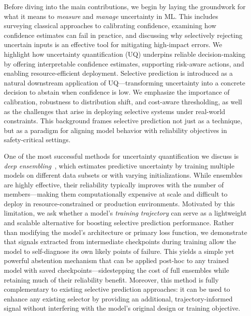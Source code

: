 Before diving into the main contributions, we begin by laying the groundwork for what it means to \emph{measure} and \emph{manage} uncertainty in ML. This includes surveying classical approaches to calibrating confidence, examining how confidence estimates can fail in practice, and discussing why selectively rejecting uncertain inputs is an effective tool for mitigating high-impact errors. We highlight how uncertainty quantification (UQ) underpins reliable decision-making by offering interpretable confidence estimates, supporting risk-aware actions, and enabling resource-efficient deployment. Selective prediction is introduced as a natural downstream application of UQ—transforming uncertainty into a concrete decision to abstain when confidence is low. We emphasize the importance of calibration, robustness to distribution shift, and cost-aware thresholding, as well as the challenges that arise in deploying selective systems under real-world constraints. This background frames selective prediction not just as a technique, but as a paradigm for aligning model behavior with reliability objectives in safety-critical settings.

One of the most successful methods for uncertainty quantification we discuss is \emph{deep ensembling}~\citep{lakshminarayanan2017simple}, which estimates predictive uncertainty by training multiple models on different data subsets or with varying initializations. While ensembles are highly effective, their reliability typically improves with the number of members—making them computationally expensive at scale and difficult to deploy in resource-constrained or production environments. Motivated by this limitation, we ask whether a model’s \emph{training trajectory} can serve as a lightweight and scalable alternative for boosting selective prediction performance. Rather than modifying the model’s architecture or primary loss function, we demonstrate that signals extracted from intermediate checkpoints during training allow the model to self-diagnose its own likely points of failure. This yields a simple yet powerful abstention mechanism that can be applied post-hoc to any trained model with saved checkpoints—sidestepping the cost of full ensembles while retaining much of their reliability benefit. Moreover, this method is fully complementary to existing selective prediction approaches: it can be used to enhance any existing selector by providing an additional, trajectory-informed signal without interfering with the model’s original design or training objective.

